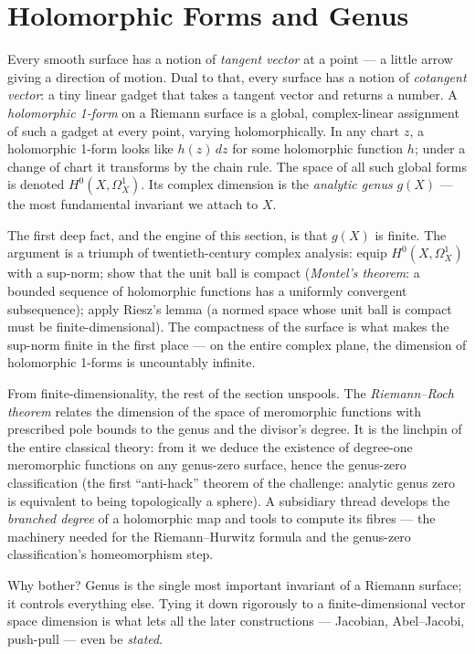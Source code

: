 \section{Holomorphic Forms and Genus}
\label{sec:holomorphic-forms-and-genus}

\begin{layman}
Every smooth surface has a notion of \emph{tangent vector} at a
point — a little arrow giving a direction of motion. Dual to that,
every surface has a notion of \emph{cotangent vector}: a tiny linear
gadget that takes a tangent vector and returns a number. A
\emph{holomorphic 1-form} on a Riemann surface is a global,
complex-linear assignment of such a gadget at every point, varying
holomorphically. In any chart \(z\), a holomorphic 1-form looks like
\(h(z)\,dz\) for some holomorphic function \(h\); under a change of
chart it transforms by the chain rule. The space of all such global
forms is denoted \(H^0(X,\Omega^1_X)\). Its complex dimension is the
\emph{analytic genus} \(g(X)\) — the most fundamental invariant we
attach to \(X\).

The first deep fact, and the engine of this section, is that \(g(X)\)
is finite. The argument is a triumph of twentieth-century complex
analysis: equip \(H^0(X,\Omega^1_X)\) with a sup-norm; show that the
unit ball is compact (\emph{Montel's theorem}: a bounded sequence of
holomorphic functions has a uniformly convergent subsequence); apply
Riesz's lemma (a normed space whose unit ball is compact must be
finite-dimensional). The compactness of the surface is what makes the
sup-norm finite in the first place — on the entire complex plane,
the dimension of holomorphic 1-forms is uncountably infinite.

From finite-dimensionality, the rest of the section unspools. The
\emph{Riemann--Roch theorem} relates the dimension of the space of
meromorphic functions with prescribed pole bounds to the genus and
the divisor's degree. It is the linchpin of the entire classical
theory: from it we deduce the existence of degree-one meromorphic
functions on any genus-zero surface, hence the genus-zero
classification (the first ``anti-hack'' theorem of the challenge:
analytic genus zero is equivalent to being topologically a sphere).
A subsidiary thread develops the \emph{branched degree} of a
holomorphic map and tools to compute its fibres — the machinery
needed for the Riemann--Hurwitz formula and the genus-zero
classification's homeomorphism step.

Why bother? Genus is the single most important invariant of a
Riemann surface; it controls everything else. Tying it down rigorously
to a finite-dimensional vector space dimension is what lets all the
later constructions — Jacobian, Abel--Jacobi, push-pull — even be
\emph{stated}.
\end{layman}

